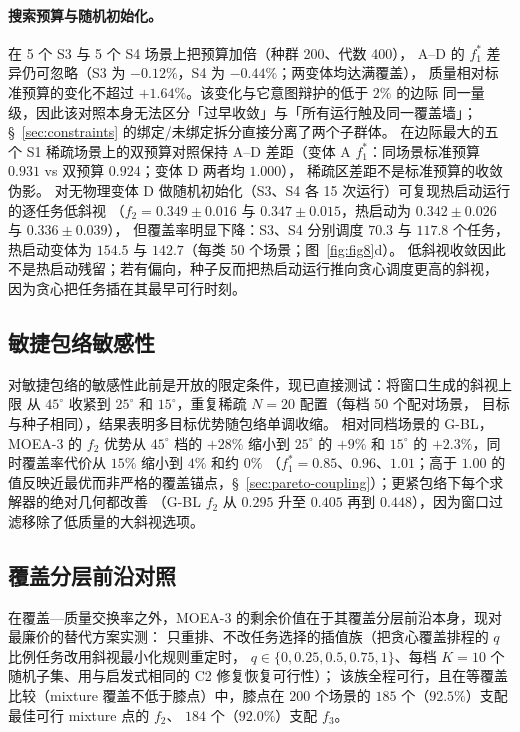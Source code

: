 \documentclass[preprint,12pt,authoryear]{elsarticle}
\begin{document}
\paragraph{搜索预算与随机初始化。}
在 5 个 S3 与 5 个 S4 场景上把预算加倍（种群 200、代数 400），
A--D 的 $f_1^*$ 差异仍可忽略（S3 为 $-0.12\%$，S4 为 $-0.44\%$；两变体均达满覆盖），
质量相对标准预算的变化不超过 $+1.64\%$。该变化与它意图辩护的低于 $2\%$ 的边际
同一量级，因此该对照本身无法区分「过早收敛」与「所有运行触及同一覆盖墙」；
\S~\ref{sec:constraints} 的绑定/未绑定拆分直接分离了两个子群体。
在边际最大的五个 S1 稀疏场景上的双预算对照保持 A--D 差距（变体 A $f_1^*$：同场景标准预算 $0.931$ vs 双预算 $0.924$；变体 D 两者均 $1.000$），
稀疏区差距不是标准预算的收敛伪影。
对无物理变体 D 做随机初始化（S3、S4 各 15 次运行）可复现热启动运行的逐任务低斜视
（$f_2=0.349\pm0.016$ 与 $0.347\pm0.015$，热启动为 $0.342\pm0.026$ 与 $0.336\pm0.039$），
但覆盖率明显下降：S3、S4 分别调度 $70.3$ 与 $117.8$ 个任务，
热启动变体为 $154.5$ 与 $142.7$（每类 50 个场景；图~\ref{fig:fig8}d）。
低斜视收敛因此不是热启动残留；若有偏向，种子反而把热启动运行推向贪心调度更高的斜视，
因为贪心把任务插在其最早可行时刻。

\subsection{敏捷包络敏感性}\label{sec:envelope-sensitivity}
对敏捷包络的敏感性此前是开放的限定条件，现已直接测试：将窗口生成的斜视上限
从 $45^\circ$ 收紧到 $25^\circ$ 和 $15^\circ$，重复稀疏 $N=20$ 配置（每档 50 个配对场景，
目标与种子相同），结果表明多目标优势随包络单调收缩。
相对同档场景的 G-BL，MOEA-3 的 $f_2$ 优势从 $45^\circ$ 档的 $+28\%$ 缩小到 $25^\circ$ 的 $+9\%$
和 $15^\circ$ 的 $+2.3\%$，同时覆盖率代价从 $15\%$ 缩小到 $4\%$ 和约 $0\%$
（$f_1^* = 0.85$、$0.96$、$1.01$；高于 $1.00$ 的值反映近最优而非严格的覆盖锚点，\S~\ref{sec:pareto-coupling}）；更紧包络下每个求解器的绝对几何都改善
（G-BL $f_2$ 从 $0.295$ 升至 $0.405$ 再到 $0.448$），因为窗口过滤移除了低质量的大斜视选项。

\subsection{覆盖分层前沿对照}\label{sec:frontier-control}
在覆盖—质量交换率之外，MOEA-3 的剩余价值在于其覆盖分层前沿本身，现对最廉价的替代方案实测：
只重排、不改任务选择的插值族（把贪心覆盖排程的 $q$ 比例任务改用斜视最小化规则重定时，
$q\in\{0,0.25,0.5,0.75,1\}$、每档 $K=10$ 个随机子集、用与启发式相同的 C2 修复恢复可行性）；
该族全程可行，且在等覆盖比较（mixture 覆盖不低于膝点）中，膝点在 $200$ 个场景的 $185$ 个（$92.5\%$）支配最佳可行 mixture 点的 $f_2$、
$184$ 个（$92.0\%$）支配 $f_3$。
\end{document}
